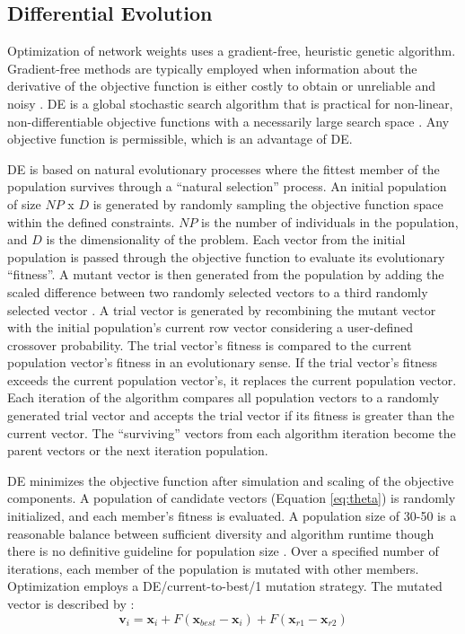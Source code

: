 \subsection{Differential Evolution}
\label{subsec:04de}

Optimization of network weights uses a gradient-free, heuristic genetic algorithm. Gradient-free methods are typically employed when information about the derivative of the objective function is either costly to obtain or unreliable and noisy \citep{conn2009introduction}. \Gls{DE} is a global stochastic search algorithm that is practical for non-linear, non-differentiable objective functions with a necessarily large search space \citep{rios2013derivativefree}. Any objective function is permissible, which is an advantage of \gls{DE}.

\Gls{DE} is based on natural evolutionary processes where the fittest member of the population survives through a ``natural selection'' process. An initial population of size $NP$ x $D$ is generated by randomly sampling the objective function space within the defined constraints. $NP$ is the number of individuals in the population, and $D$ is the dimensionality of the problem. Each vector from the initial population is passed through the objective function to evaluate its evolutionary ``fitness''. A mutant vector is then generated from the population by adding the scaled difference between two randomly selected vectors to a third randomly selected vector \citep{price2013differential}. A trial vector is generated by recombining the mutant vector with the initial population's current row vector considering a user-defined crossover probability. The trial vector's fitness is compared to the current population vector's fitness in an evolutionary sense. If the trial vector's fitness exceeds the current population vector's, it replaces the current population vector. Each iteration of the algorithm compares all population vectors to a randomly generated trial vector and accepts the trial vector if its fitness is greater than the current vector. The ``surviving'' vectors from each algorithm iteration become the parent vectors or the next iteration population.

\Gls{DE} minimizes the objective function after simulation and scaling of the objective components. A population of candidate vectors (Equation \ref{eq:theta}) is randomly initialized, and each member's fitness is evaluated. A population size of 30-50 is a reasonable balance between sufficient diversity and algorithm runtime though there is no definitive guideline for population size \citep{piotrowski2017review}. Over a specified number of iterations, each member of the population is mutated with other members. Optimization employs a DE/current-to-best/1 mutation strategy. The mutated vector is described by \citep{georgioudakis2020comparative}:
\begin{equation}
    \mathbf{v}_{i} = \mathbf{x}_{i} + F(\mathbf{x}_{best}-\mathbf{x}_{i}) + F(\mathbf{x}_{r1} - \mathbf{x}_{r2})
    \label{eq:mutation}
\end{equation}


